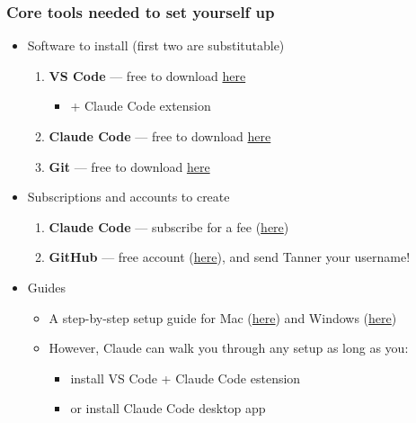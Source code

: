 \documentclass[aspectratio=169, 12pt]{beamer}
\begin{document}
\begin{frame}
\frametitle{Core tools needed to set yourself up }
\begin{itemize}
    \item Software to install {\color{gray}(first two are substitutable)}
        \begin{enumerate}
            \item \textbf{VS Code} --- free to download \href{https://code.visualstudio.com/download}{here}
            \begin{itemize}
                \item + Claude Code extension
            \end{itemize}
            \item \textbf{Claude Code} --- free to download \href{https://claude.com/download}{here}
            \item \textbf{Git} --- free to download \href{https://git-scm.com/install/windows}{here}
        \end{enumerate}
    \item Subscriptions and accounts to create
        \begin{enumerate}
            \item \textbf{Claude Code} --- subscribe for a fee (\href{claude.com}{here})
            \item \textbf{GitHub} --- free account (\href{https://github.com/}{here}), and send Tanner your username!
        \end{enumerate}
    \item Guides
    \begin{itemize}
        \item A step-by-step setup guide for Mac (\href{https://github.com/tannerregan/GWU\_AI\_study\_group/blob/main/notes/Mac\_AI\_Setup\_Guide.md}{here}) and Windows (\href{https://github.com/tannerregan/GWU\_AI\_study\_group/blob/main/notes/Windows\_AI\_Setup\_Guide.md}{here})
        \item However, Claude can walk you through any setup as long as you:
        \begin{itemize}
            \item install VS Code + Claude Code estension
            \item or install Claude Code desktop app
        \end{itemize}
    \end{itemize}
\end{itemize}
\end{frame}
\end{document}
